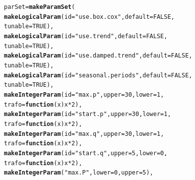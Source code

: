 \documentclass[12pt]{article}\usepackage[]{graphicx}\usepackage[]{color}
\makeatletter
\newcommand{\hlnum}[1]{\textcolor[rgb]{0.686,0.059,0.569}{#1}}%
\newcommand{\hlstr}[1]{\textcolor[rgb]{0.192,0.494,0.8}{#1}}%
\newcommand{\hlopt}[1]{\textcolor[rgb]{0,0,0}{#1}}%
\newcommand{\hlstd}[1]{\textcolor[rgb]{0.345,0.345,0.345}{#1}}%
\newcommand{\hlkwa}[1]{\textcolor[rgb]{0.161,0.373,0.58}{\textbf{#1}}}%
\newcommand{\hlkwb}[1]{\textcolor[rgb]{0.69,0.353,0.396}{#1}}%
\newcommand{\hlkwc}[1]{\textcolor[rgb]{0.333,0.667,0.333}{#1}}%
\newcommand{\hlkwd}[1]{\textcolor[rgb]{0.737,0.353,0.396}{\textbf{#1}}}%
\newenvironment{kframe}{%
 \def\at@end@of@kframe{}%
 \ifinner\ifhmode%
  \def\at@end@of@kframe{\end{minipage}}%
  \begin{minipage}{\columnwidth}%
 \fi\fi%
 \def\FrameCommand##1{\hskip\@totalleftmargin \hskip-\fboxsep
 \colorbox{shadecolor}{##1}\hskip-\fboxsep
     \hskip-\linewidth \hskip-\@totalleftmargin \hskip\columnwidth}%
 \MakeFramed {\advance\hsize-\width
   \@totalleftmargin\z@ \linewidth\hsize
   \@setminipage}}%
 {\par\unskip\endMakeFramed%
 \at@end@of@kframe}
\newenvironment{knitrout}{}{} %
\theoremstyle{definition}
\makeatother
\begin{document}
\singlespacing                                      
\begin{knitrout}
\color{fgcolor}\begin{kframe}
\begin{alltt}
\hlstd{parSet} \hlkwb{=} \hlkwd{makeParamSet}\hlstd{(}
           \hlkwd{makeLogicalParam}\hlstd{(}\hlkwc{id} \hlstd{=} \hlstr{"use.box.cox"}\hlstd{,}\hlkwc{default} \hlstd{=} \hlnum{FALSE}\hlstd{,}
                            \hlkwc{tunable} \hlstd{=} \hlnum{TRUE}\hlstd{),}
           \hlkwd{makeLogicalParam}\hlstd{(}\hlkwc{id} \hlstd{=} \hlstr{"use.trend"}\hlstd{,} \hlkwc{default} \hlstd{=} \hlnum{FALSE}\hlstd{,}
                            \hlkwc{tunable} \hlstd{=} \hlnum{TRUE}\hlstd{),}
           \hlkwd{makeLogicalParam}\hlstd{(}\hlkwc{id} \hlstd{=} \hlstr{"use.damped.trend"}\hlstd{,} \hlkwc{default} \hlstd{=} \hlnum{FALSE}\hlstd{,}
                            \hlkwc{tunable} \hlstd{=} \hlnum{TRUE}\hlstd{),}
           \hlkwd{makeLogicalParam}\hlstd{(}\hlkwc{id} \hlstd{=} \hlstr{"seasonal.periods"}\hlstd{,} \hlkwc{default} \hlstd{=} \hlnum{FALSE}\hlstd{,}
                            \hlkwc{tunable} \hlstd{=} \hlnum{TRUE}\hlstd{),}
           \hlkwd{makeIntegerParam}\hlstd{(}\hlkwc{id} \hlstd{=} \hlstr{"max.p"}\hlstd{,} \hlkwc{upper} \hlstd{=} \hlnum{30}\hlstd{,} \hlkwc{lower} \hlstd{=} \hlnum{1}\hlstd{,}
                            \hlkwc{trafo} \hlstd{=} \hlkwa{function}\hlstd{(}\hlkwc{x}\hlstd{) x}\hlopt{*}\hlnum{2}\hlstd{),}
           \hlkwd{makeIntegerParam}\hlstd{(}\hlkwc{id} \hlstd{=} \hlstr{"start.p"}\hlstd{,} \hlkwc{upper} \hlstd{=} \hlnum{30}\hlstd{,} \hlkwc{lower} \hlstd{=} \hlnum{1}\hlstd{,}
                            \hlkwc{trafo} \hlstd{=} \hlkwa{function}\hlstd{(}\hlkwc{x}\hlstd{) x}\hlopt{*}\hlnum{2}\hlstd{),}
           \hlkwd{makeIntegerParam}\hlstd{(}\hlkwc{id} \hlstd{=} \hlstr{"max.q"}\hlstd{,} \hlkwc{upper} \hlstd{=} \hlnum{30}\hlstd{,} \hlkwc{lower} \hlstd{=} \hlnum{1}\hlstd{,}
                            \hlkwc{trafo} \hlstd{=} \hlkwa{function}\hlstd{(}\hlkwc{x}\hlstd{) x}\hlopt{*}\hlnum{2}\hlstd{),}
           \hlkwd{makeIntegerParam}\hlstd{(}\hlkwc{id} \hlstd{=} \hlstr{"start.q"}\hlstd{,} \hlkwc{upper} \hlstd{=} \hlnum{5}\hlstd{,} \hlkwc{lower} \hlstd{=} \hlnum{0}\hlstd{,}
                            \hlkwc{trafo} \hlstd{=} \hlkwa{function}\hlstd{(}\hlkwc{x}\hlstd{) x}\hlopt{*}\hlnum{2}\hlstd{),}
           \hlkwd{makeIntegerParam}\hlstd{(}\hlstr{"max.P"}\hlstd{,} \hlkwc{lower} \hlstd{=} \hlnum{0}\hlstd{,} \hlkwc{upper} \hlstd{=} \hlnum{5}\hlstd{),}

\end{alltt}
\end{kframe}
\end{knitrout}
\end{document}
